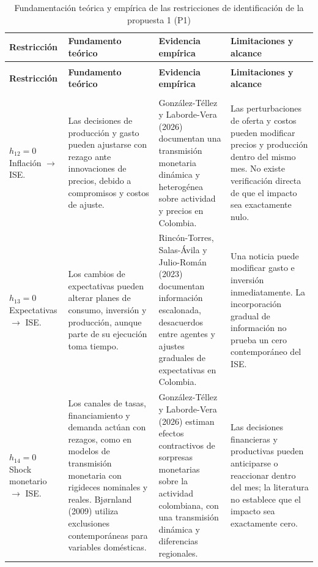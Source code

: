 \documentclass[12pt,letterpaper]{article}
\begin{document}
\begin{longtable}{@{}>{\raggedright\arraybackslash}p{}>{\raggedright\arraybackslash}p{}>{\raggedright\arraybackslash}p{}>{\raggedright\arraybackslash}p{}@{}}
\caption{Fundamentación teórica y empírica de las restricciones de identificación de la propuesta 1 (P1)}\label{tab:fundamentos_p1}\\
\toprule
\textbf{Restricción} & \textbf{Fundamento teórico} & \textbf{Evidencia empírica} & \textbf{Limitaciones y alcance}\\
\midrule
\endfirsthead

\multicolumn{4}{@{}l}{\textit{Cuadro \thetable\ (continuación)}}\\
\toprule
\textbf{Restricción} & \textbf{Fundamento teórico} & \textbf{Evidencia empírica} & \textbf{Limitaciones y alcance}\\
\midrule
\endhead

\midrule
\multicolumn{4}{r@{}}{\footnotesize\textit{Continúa en la página siguiente}}\\
\endfoot

\bottomrule
\endlastfoot

\textbf{$h_{12}=0$}\newline
Inflación $\rightarrow$ ISE.
& Las decisiones de producción y gasto pueden ajustarse con rezago ante innovaciones de precios, debido a compromisos y costos de ajuste.
& González-Téllez y Laborde-Vera (2026) documentan una transmisión monetaria dinámica y heterogénea sobre actividad y precios en Colombia.
& Las perturbaciones de oferta y costos pueden modificar precios y producción dentro del mismo mes. No existe verificación directa de que el impacto sea exactamente nulo.\\
\midrule

\textbf{$h_{13}=0$}\newline
Expectativas $\rightarrow$ ISE.
& Los cambios de expectativas pueden alterar planes de consumo, inversión y producción, aunque parte de su ejecución toma tiempo.
& Rincón-Torres, Salas-Ávila y Julio-Román (2023) documentan información escalonada, desacuerdos entre agentes y ajustes graduales de expectativas en Colombia.
& Una noticia puede modificar gasto e inversión inmediatamente. La incorporación gradual de información no prueba un cero contemporáneo del ISE.\\
\midrule

\textbf{$h_{14}=0$}\newline
Shock monetario $\rightarrow$ ISE.
& Los canales de tasas, financiamiento y demanda actúan con rezagos, como en modelos de transmisión monetaria con rigideces nominales y reales. Bj{\o}rnland (2009) utiliza exclusiones contemporáneas para variables domésticas.
& González-Téllez y Laborde-Vera (2026) estiman efectos contractivos de sorpresas monetarias sobre la actividad colombiana, con una transmisión dinámica y diferencias regionales.
& Las decisiones financieras y productivas pueden anticiparse o reaccionar dentro del mes; la literatura no establece que el impacto sea exactamente cero.\\
\midrule


\end{longtable}
\end{document}
